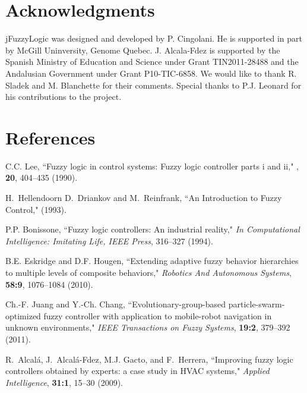 \documentclass[11pt,twoside]{article}
\begin{document}
\begin{multicols}{2}
\vspace{-0.19cm}
\section*{Acknowledgments}

jFuzzyLogic was designed and developed by P. Cingolani. He is supported in part by McGill Uninversity, Genome Quebec. J. Alcala-Fdez is supported by the Spanish Ministry of Education and Science under Grant TIN2011-28488 and the Andalusian Government under Grant P10-TIC-6858. We would like to thank R. Sladek and M. Blanchette for their comments. Special thanks to P.J. Leonard for his contributions to the project.

\vspace{-0.19cm}
\section*{References}
% 
% 
\begin{thebibliography}{10}

C.C. Lee,
\newblock ``Fuzzy logic in control systems: Fuzzy logic controller parts i and
  ii,"
,
  {\bf 20}, 404--435 (1990).

H.~Hellendoorn D.~Driankov and M.~Reinfrank,
\newblock ``An Introduction to Fuzzy Control,"
 (1993).

P.P. Bonissone, 
\newblock ``Fuzzy logic controllers: An industrial reality," {\it In Computational Intelligence: Imitating Life, IEEE Press}, 316--327 (1994).

B.E. Eskridge and D.F. Hougen,
\newblock ``Extending adaptive fuzzy behavior hierarchies to multiple levels of
  composite behaviors," {\it Robotics And Autonomous Systems}, {\bf 58:9}, 1076--1084 (2010).

Ch.-F. Juang and Y.-Ch. Chang,
\newblock ``Evolutionary-group-based particle-swarm-optimized fuzzy controller
  with application to mobile-robot navigation in unknown environments," {\it IEEE Transactions on Fuzzy Systems}, {\bf 19:2}, 379--392 (2011).

R.~Alcal{\'a}, J.~Alcal{\'a}-Fdez, M.J. Gacto, and F.~Herrera,
\newblock ``Improving fuzzy logic controllers obtained by experts: a case study
  in HVAC systems," {\it Applied Intelligence}, {\bf 31:1}, 15--30 (2009).


\end{thebibliography}
\end{multicols}
\end{document}
